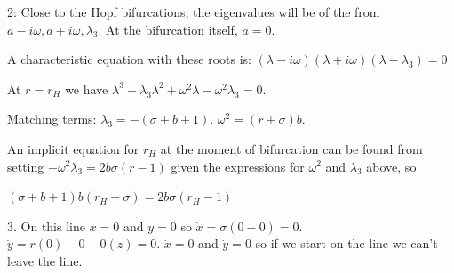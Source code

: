 \documentclass[12pt,letterpaper,noanswers]{exam}
\begin{document}
2: Close to the Hopf bifurcations, the eigenvalues will be of the from $a - i\omega, a + i\omega, \lambda_3$.  At the bifurcation itself, $a = 0$.

A characteristic equation with these roots is:
$(\lambda - i\omega)(\lambda+i\omega)(\lambda-\lambda_3) = 0$

At $r = r_H$ we have $\lambda^3 - \lambda_3 \lambda^2 + \omega^2 \lambda - \omega^2\lambda_3 = 0$.

Matching terms: $\lambda_3 = -(\sigma + b +1)$.  $\omega^2 = (r+\sigma)b$.  

An implicit equation for $r_H$ at the moment of bifurcation can be found from setting $-\omega^2\lambda_3 = 2b\sigma(r-1)$ given the expressions for $\omega^2$ and $\lambda_3$ above, so 

$(\sigma+b+1)b(r_H+\sigma) = 2b\sigma(r_H-1)$

3. On this line $x = 0$ and $y=0$ so $\dot x = \sigma(0-0) = 0$.  $\dot y = r(0)-0-0(z) = 0$.  $\dot x = 0$ and $\dot y = 0$ so if we start on the line we can't leave the line.
\end{document}
